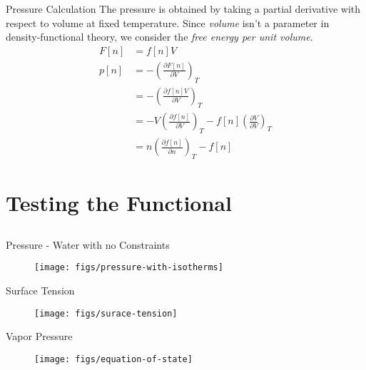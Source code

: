 \documentclass{beamer}
\begin{document}
\begin{frame}[fragile]{Pressure Calculation}
The pressure is obtained by taking a partial
derivative with respect to volume at fixed temperature.  Since
\emph{volume} isn't a parameter in density-functional theory, we
consider the \emph{free energy per unit volume}.
\begin{align}
  F[n] &= f[n]V \\
  p[n] &= -\left(\frac{\partial F[n]}{\partial V}\right)_{T} \\
  &= -\left(\frac{\partial f[n]V}{\partial V}\right)_{T} \\
  &= -V\left(\frac{\partial f[n]}{\partial V}\right)_{T}
   - f[n]\left(\frac{\partial V}{\partial V}\right)_{T} \\
  &= n \left(\frac{\partial f[n]}{\partial n}\right)_{T} - f[n]
\end{align}
\end{frame}

\section{Testing the Functional}
\subsection*{}

\begin{frame}[fragile]{Pressure - Water with no Constraints}
\begin{figure}
\begin{center}
\texttt{[image: figs/pressure-with-isotherms]}
\end{center}
\end{figure} 
\end{frame}

\begin{frame}[fragile]{Surface Tension}
\begin{figure}
\begin{center}
\texttt{[image: figs/surace-tension]}
\end{center}
\end{figure} 
\end{frame}

\begin{frame}[fragile]{Vapor Pressure}
\begin{figure}
\begin{center}
\texttt{[image: figs/equation-of-state]}
\end{center}
\end{figure}
\end{frame}
\end{document}
